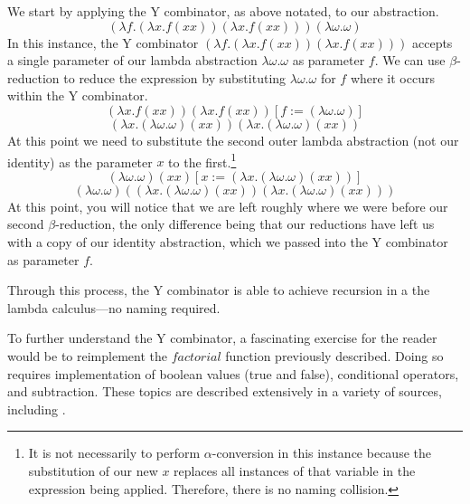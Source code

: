 \documentclass[twocolumn,titlepage,12pt]{article}
\begin{document}
We start by applying the Y combinator, as above notated, to our abstraction.
$$(\lambda f.(\lambda x.f(x x))(\lambda x.f(x x)))(\lambda \omega.\omega)$$
In this instance, the Y combinator $(\lambda f.(\lambda x.f(x x))(\lambda x.f(x x)))$ accepts a single parameter of our lambda abstraction $\lambda \omega.\omega$ as parameter $f$. We can use $\beta$-reduction to reduce the expression by substituting $\lambda \omega.\omega$ for $f$ where it occurs within the Y combinator.
$$(\lambda x.f(x x))(\lambda x.f(x x))[f:=(\lambda \omega.\omega)]$$
$$(\lambda x.(\lambda \omega.\omega)(x x))(\lambda x.(\lambda \omega.\omega)(x x))$$
At this point we need to substitute the second outer lambda abstraction (not our identity) as the parameter $x$ to the first.\footnote{It is not necessarily to perform $\alpha$-conversion in this instance because the substitution of our new $x$ replaces all instances of that variable in the expression being applied. Therefore, there is no naming collision.}
$$(\lambda \omega.\omega)(x x)[x:=(\lambda x.(\lambda \omega.\omega)(x x))]$$
$$(\lambda \omega.\omega)((\lambda x.(\lambda \omega.\omega)(x x))(\lambda x.(\lambda \omega.\omega)(x x)))$$
At this point, you will notice that we are left roughly where we were before our second $\beta$-reduction, the only difference being that our reductions have left us with a copy of our identity abstraction, which we passed into the Y combinator as parameter $f$.

Through this process, the Y combinator is able to achieve recursion in a the lambda calculus---no naming required.

To further understand the Y combinator, a fascinating exercise for the reader would be to reimplement the $factorial$ function previously described. Doing so requires implementation of boolean values (true and false), conditional operators, and subtraction. These topics are described extensively in a variety of sources, including \cite{stanfordlc}\cite{cornelllc}.
\end{document}
